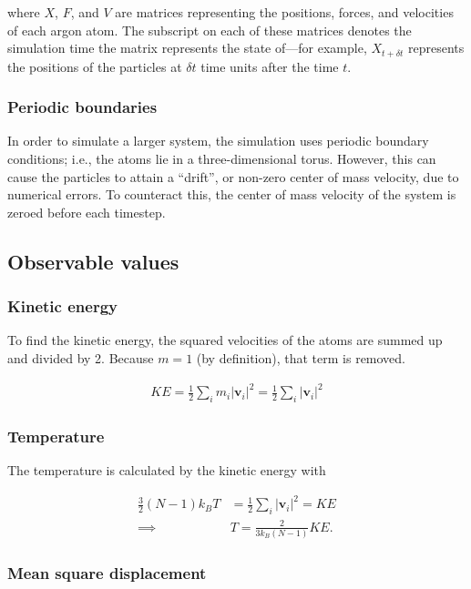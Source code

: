 \documentclass[twocolumn]{revtex4}
\begin{document}
where $X$, $F$, and $V$ are matrices representing the positions, forces, and velocities of each argon atom. The subscript on each of these matrices denotes the simulation time the matrix represents the state of---for example, $X_{t+\delta t}$ represents the positions of the particles at $\delta t$ time units after the time $t$.

\subsubsection{Periodic boundaries}

In order to simulate a larger system, the simulation uses periodic boundary conditions; i.e., the atoms lie in a three-dimensional torus. However, this can cause the particles to attain a ``drift'', or non-zero center of mass velocity, due to numerical errors. To counteract this, the center of mass velocity of the system is zeroed before each timestep.

\subsection{Observable values}

\subsubsection{Kinetic energy}
\label{sec:ke}

To find the kinetic energy, the squared velocities of the atoms are summed up and divided by 2. Because $m=1$ (by definition), that term is removed.

\begin{align}
KE = \frac{1}{2} \sum_i m_i |\mathbf{v}_i|^2 = \frac{1}{2} \sum_i |\mathbf{v}_i|^2
\end{align}

\subsubsection{Temperature}
\label{sec:temp}

The temperature is calculated by the kinetic energy with

\begin{align}
\frac{3}{2} (N-1) k_B T &= \frac{1}{2} \sum_i |\mathbf{v}_i|^2 = KE\\
\implies & T = \frac{2}{3 k_B (N-1)} KE.
\end{align}

\subsubsection{Mean square displacement}
\label{sec:msd}
\end{document}
